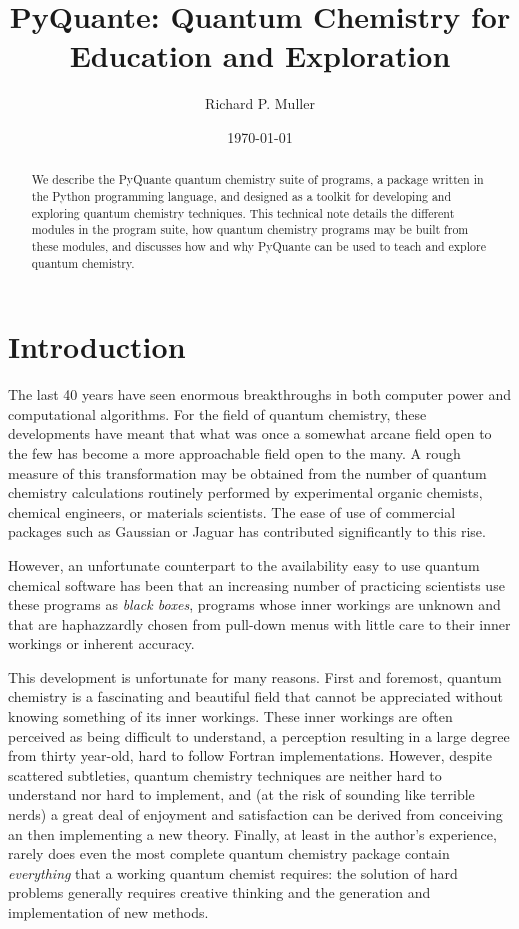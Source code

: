 \documentclass[twocolumn]{revtex4}
\begin{document}
\title{PyQuante: Quantum Chemistry for Education and Exploration}
\author{Richard P. Muller}
\date{\today}

\begin{abstract}
We describe the PyQuante quantum chemistry suite of programs, a
package written in the Python programming language, and designed as a
toolkit for developing and exploring quantum chemistry
techniques. This technical note details the different modules in the
program suite, how quantum chemistry programs may be built from these
modules, and discusses how and why PyQuante can be used to teach and
explore quantum chemistry.
\end{abstract}

\maketitle

\section{Introduction}
The last 40 years have seen enormous breakthroughs in both computer
power and computational algorithms. For the field of quantum
chemistry, these developments have meant that what was once a somewhat
arcane field open to the few has become a more approachable field open
to the many. A rough measure of this transformation may be obtained
from the number of quantum chemistry calculations routinely performed
by experimental organic chemists, chemical engineers, or materials
scientists. The ease of use of commercial packages such as Gaussian or
Jaguar has contributed significantly to this rise.

However, an unfortunate counterpart to the availability easy to use
quantum chemical software has been that an increasing number of
practicing scientists use these programs as \emph{black boxes},
programs whose inner workings are unknown and that are haphazzardly
chosen from pull-down menus with little care to their inner workings
or inherent accuracy.

This development is unfortunate for many reasons. First and foremost,
quantum chemistry is a fascinating and beautiful field that cannot be
appreciated without knowing something of its inner workings. These
inner workings are often perceived as being difficult to understand,
a perception resulting in a large degree from thirty year-old, hard to
follow Fortran implementations. However, despite scattered subtleties,
quantum chemistry techniques are neither hard to understand nor hard
to implement, and (at the risk of sounding like terrible nerds) a
great deal of enjoyment and satisfaction can be derived from
conceiving an then implementing a new theory. Finally, at least in the
author's experience, rarely does even the most complete quantum
chemistry package contain \emph{everything} that a working quantum
chemist requires: the solution of hard problems generally requires
creative thinking and the generation and implementation of new
methods. 
\end{document}

